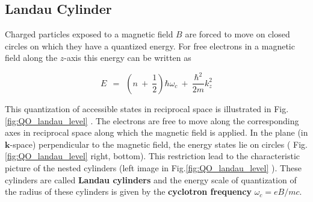 \documentclass[10pt]{report}
\numberwithin{equation}{chapter}
\newcommand{\myRef}[1]{
  Fig.\ref{#1}
}
\newcommand{\vc}[1]{ %
  \mathbf{#1}
}
\begin{document}
\subsection{Landau Cylinder}

Charged particles exposed to a magnetic field $B$ are forced to move on closed circles on which they have a quantized energy. For free electrons in a magnetic field along the $z$-axis this energy can be written as

\begin{equation}
  E ~~=~~ \left( n ~+~ \frac{1}{2} \right) \hbar \omega_c ~+~ \frac{\hbar^2}{2m} k_z^2
\end{equation}


This quantization of accessible states in reciprocal space is illustrated in \myRef{fig:QO_landau_level}. 
The electrons are free to move along the corresponding axes in reciprocal space along which the magnetic field is applied. In the plane (in $\vc{k}$-space) perpendicular to the magnetic field, the energy states lie on circles (\myRef{fig:QO_landau_level} right, bottom). This restriction lead to the characteristic picture of the nested cylinders (left image in \myRef{fig:QO_landau_level}). These cylinders are called \textbf{Landau cylinders} and the energy scale of quantization of the radius of these cylinders is given by the \textbf{cyclotron frequency} $\omega_c = eB/mc$.
\end{document}
